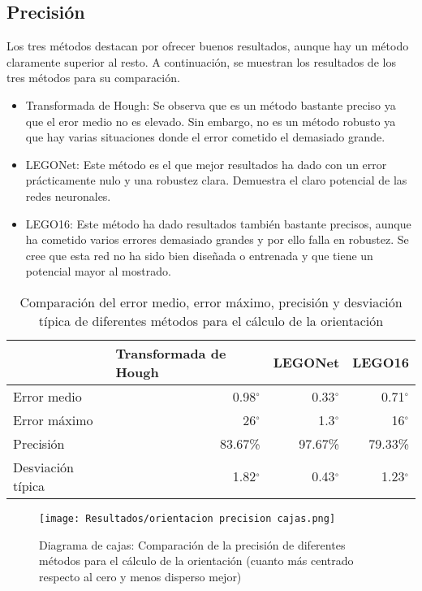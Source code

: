 \subsection{Precisión}
Los tres métodos destacan por ofrecer buenos resultados, aunque hay un método claramente superior al resto. A continuación, se muestran los resultados de los tres métodos para su comparación.

\begin{itemize}
\item Transformada de Hough: Se observa que es un método bastante preciso ya que el eror medio no es elevado. Sin embargo, no es un método robusto ya que hay varias situaciones donde el error cometido el demasiado grande.
\item LEGONet: Este método es el que mejor resultados ha dado con un error prácticamente nulo y una robustez clara. Demuestra el claro potencial de las redes neuronales.
\item LEGO16: Este método ha dado resultados también bastante precisos, aunque ha cometido varios errores demasiado grandes y por ello falla en robustez. Se cree que esta red no ha sido bien diseñada o entrenada y que tiene un potencial mayor al mostrado.
\end{itemize}

\begin{table}[ht] %
  \centering
    \begin{tabular}{|l|r|r|r|}
    \cline{2-4} \multicolumn{1}{r|}{} & \multicolumn{1}{l|}{Transformada de Hough} & \multicolumn{1}{l|}{LEGONet} & \multicolumn{1}{l|}{LEGO16}\\	
    \hline
    Error medio & 0.98$^{\circ}$  & 0.33$^{\circ}$ & 0.71$^{\circ}$ \\
    \hline
    Error máximo & 26$^{\circ}$  & 1.3$^{\circ}$ & 16$^{\circ}$ \\
    \hline
    Precisión & 83.67\% & 97.67\% & 79.33\% \\
    \hline
    Desviación típica & 1.82$^{\circ}$ & 0.43$^{\circ}$ & 1.23$^{\circ}$ \\
    \hline
    \end{tabular}%
  \label{tab:oreintacion precision cajas}%
  \caption{Comparación del error medio, error máximo, precisión y desviación típica de diferentes métodos para el cálculo de la orientación}
\end{table}

\begin{figure}[ht]  %
	\centering
	\texttt{[image: Resultados/orientacion precision cajas.png]}
	\caption{Diagrama de cajas: Comparación de la precisión de diferentes métodos para el cálculo de la orientación (cuanto más centrado respecto al cero y menos disperso mejor)}
	\label{fig:oreintacion precision cajas}
\end{figure}

